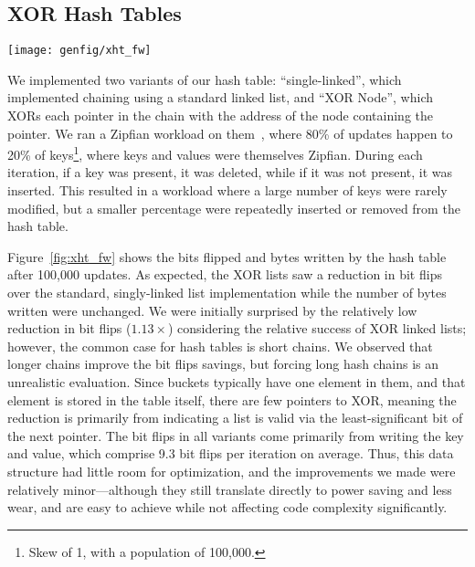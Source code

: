 









\subsection{XOR Hash Tables}

\begin{SCfigure}
	\centering
	\texttt{[image: genfig/xht\_fw]}
	\caption{Memory characteristics of XOR hash table variants under Zipfian
		workload.}
	\label{fig:xht_fw}
\end{SCfigure}

We implemented two variants of our hash table: ``single-linked'', which
implemented chaining using a standard linked list, and
``XOR Node'', which
XORs each pointer in the chain with the address of the node containing the pointer.
We ran a Zipfian workload on them~\cite{zipf}, where 80\% of updates happen to
20\% of keys\footnote{Skew of 1, with a population of 100,000.}, where keys and values were
themselves Zipfian. During each iteration, if a key was present, it was deleted, while
if it was not present, it was inserted. This resulted in a workload where a
large number of keys were rarely modified, but a smaller percentage were
repeatedly inserted or removed from the hash table.

Figure~\ref{fig:xht_fw} shows the bits flipped and bytes written by the hash
table after 100,000 updates. As expected, the XOR lists saw a reduction in bit
flips over the standard, singly-linked list implementation while the number of
bytes written were unchanged. We were initially surprised by the relatively low
reduction in bit flips ($1.13\times$) considering the relative success of XOR linked
lists; however, the common case for hash tables is short chains. We observed
that longer chains improve the bit flips savings, but forcing long hash chains is
an unrealistic evaluation. Since buckets typically have one element in them, and
that element is stored in the table itself, there are few pointers to XOR,
meaning the reduction is primarily from indicating a list is valid via the
least-significant bit of the next pointer. The bit flips in all variants come
primarily from writing the key and value, which comprise 9.3 bit flips per
iteration on average. Thus, this data structure had little room for optimization,
and the improvements we made were relatively minor---although they still
translate directly to power saving and less wear, and are easy to achieve while
not affecting code complexity significantly.

